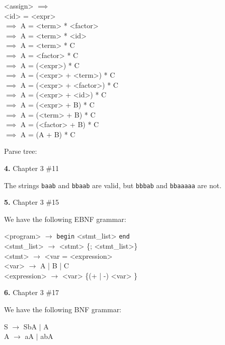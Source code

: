 \documentclass[letterpaper, 11pt]{article}
\newcommand{\hwnumbersec}[2]{\medskip \noindent\textbf{#1.} Chapter 3 \##2 \smallskip}
\newcommand{\To}{$\rightarrow$ }
\begin{document}
\begin{minipage}{0.8\textwidth}
\centering
\begin{grammar}
	<assign> $\implies$\\
	<id> = <expr> \\
	$\implies$ A = <term> * <factor> \\
	$\implies$ A = <term> * <id>\\
	$\implies$ A = <term> * C\\
	$\implies$ A = <factor> * C\\
	$\implies$ A = (<expr>) * C\\
	$\implies$ A = (<expr> + <term>) * C\\
	$\implies$ A = (<expr> + <factor>) * C\\
	$\implies$ A = (<expr> + <id>) * C\\
	$\implies$ A = (<expr> + B) * C\\
	$\implies$ A = (<term> + B) * C\\
	$\implies$ A = (<factor> + B) * C\\
	$\implies$ A = (A + B) * C
\end{grammar}
\end{minipage}

Parse tree:

\hwnumbersec{4}{11}

The strings \texttt{baab} and \texttt{bbaab} are valid, but \texttt{bbbab} and
\texttt{bbaaaaa} are not. 

\hwnumbersec{5}{15}

We have the following EBNF grammar:
\medskip

\begin{minipage}{0.8\textwidth}
\centering
\begin{grammar}
	<program> \To \texttt{begin} <stmt_list> \texttt{end}\\
	<stmt_list> \To <stmt> \{; <stmt_list>\}\\
	<stmt> \To <var = <expression>\\
	<var> \To A | B | C\\
	<expression> \To <var> \{(+ | -) <var> \}
\end{grammar}
\end{minipage}

\hwnumbersec{6}{17}

We have the following BNF grammar:
\medskip

\begin{minipage}{0.8\textwidth}
	\centering
	S \To SbA $\vert$ A \\
	A \To aA $\vert$ abA
\end{minipage}
\end{document}
